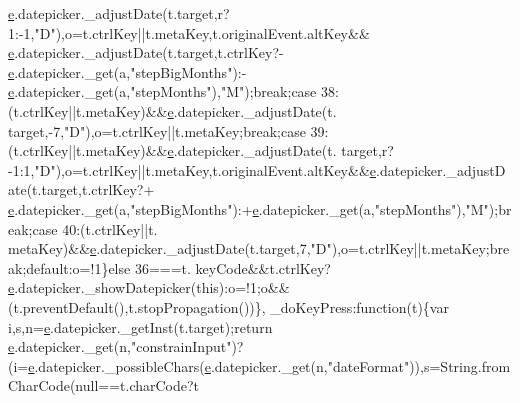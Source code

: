 \begin{DoxyCode}
      \hyperlink{jquery-ui_8min_8js_a2c038346d47955cbe2cb91e338edd7e1}{e}.datepicker.\_adjustDate(t.target,r?1:-1,\textcolor{stringliteral}{"D"}),o=t.ctrlKey||t.metaKey,t.originalEvent.altKey&&
      \hyperlink{jquery-ui_8min_8js_a2c038346d47955cbe2cb91e338edd7e1}{e}.datepicker.\_adjustDate(t.target,t.ctrlKey?-\hyperlink{jquery-ui_8min_8js_a2c038346d47955cbe2cb91e338edd7e1}{e}.datepicker.\_get(a,\textcolor{stringliteral}{"stepBigMonths"}):-
      \hyperlink{jquery-ui_8min_8js_a2c038346d47955cbe2cb91e338edd7e1}{e}.datepicker.\_get(a,\textcolor{stringliteral}{"stepMonths"}),\textcolor{stringliteral}{"M"});\textcolor{keywordflow}{break};\textcolor{keywordflow}{case} 38:(t.ctrlKey||t.metaKey)&&\hyperlink{jquery-ui_8min_8js_a2c038346d47955cbe2cb91e338edd7e1}{e}.datepicker.\_adjustDate(t.
      target,-7,\textcolor{stringliteral}{"D"}),o=t.ctrlKey||t.metaKey;\textcolor{keywordflow}{break};\textcolor{keywordflow}{case} 39:(t.ctrlKey||t.metaKey)&&\hyperlink{jquery-ui_8min_8js_a2c038346d47955cbe2cb91e338edd7e1}{e}.datepicker.\_adjustDate(t.
      target,r?-1:1,\textcolor{stringliteral}{"D"}),o=t.ctrlKey||t.metaKey,t.originalEvent.altKey&&\hyperlink{jquery-ui_8min_8js_a2c038346d47955cbe2cb91e338edd7e1}{e}.datepicker.\_adjustDate(t.target,t.ctrlKey?+
      \hyperlink{jquery-ui_8min_8js_a2c038346d47955cbe2cb91e338edd7e1}{e}.datepicker.\_get(a,\textcolor{stringliteral}{"stepBigMonths"}):+\hyperlink{jquery-ui_8min_8js_a2c038346d47955cbe2cb91e338edd7e1}{e}.datepicker.\_get(a,\textcolor{stringliteral}{"stepMonths"}),\textcolor{stringliteral}{"M"});\textcolor{keywordflow}{break};\textcolor{keywordflow}{case} 40:(t.ctrlKey||t.
      metaKey)&&\hyperlink{jquery-ui_8min_8js_a2c038346d47955cbe2cb91e338edd7e1}{e}.datepicker.\_adjustDate(t.target,7,\textcolor{stringliteral}{"D"}),o=t.ctrlKey||t.metaKey;\textcolor{keywordflow}{break};\textcolor{keywordflow}{default}:o=!1\}\textcolor{keywordflow}{else} 36===t.
      keyCode&&t.ctrlKey?\hyperlink{jquery-ui_8min_8js_a2c038346d47955cbe2cb91e338edd7e1}{e}.datepicker.\_showDatepicker(\textcolor{keyword}{this}):o=!1;o&&(t.preventDefault(),t.stopPropagation())\},
      \_doKeyPress:\textcolor{keyword}{function}(t)\{var i,s,n=\hyperlink{jquery-ui_8min_8js_a2c038346d47955cbe2cb91e338edd7e1}{e}.datepicker.\_getInst(t.target);\textcolor{keywordflow}{return} \hyperlink{jquery-ui_8min_8js_a2c038346d47955cbe2cb91e338edd7e1}{e}.datepicker.\_get(n,\textcolor{stringliteral}{"constrainInput"})?
      (i=\hyperlink{jquery-ui_8min_8js_a2c038346d47955cbe2cb91e338edd7e1}{e}.datepicker.\_possibleChars(\hyperlink{jquery-ui_8min_8js_a2c038346d47955cbe2cb91e338edd7e1}{e}.datepicker.\_get(n,\textcolor{stringliteral}{"dateFormat"})),s=String.fromCharCode(null==t.charCode?t

\end{DoxyCode}
